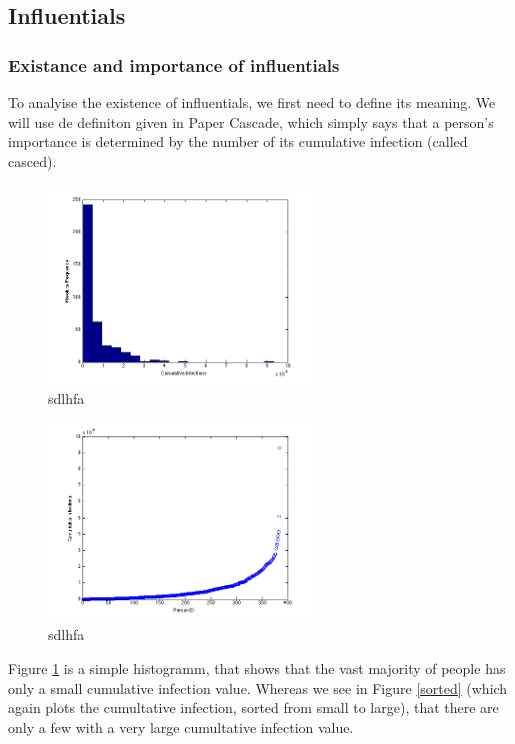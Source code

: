 \subsection{Influentials}

\subsubsection{Existance and importance of influentials}


To analyise the existence of influentials, we first need to define its meaning. We will use de definiton given in Paper Cascade\cite{Influentials}, which simply says that a person's importance is determined by the number of its cumulative infection (called casced).

\begin{figure}
\includegraphics[width=7cm]{influ2}
\caption{sdlhfa}
\label{Histo}
\end{figure}

\begin{figure}
\includegraphics[width=7cm]{influ1}
\caption{sdlhfa}
\label{Sorted}
\end{figure}

Figure \ref{Histo} is a simple histogramm, that shows that the vast majority of people has only a small cumulative infection value. Whereas we see in Figure \ref{sorted} (which again plots the cumultative infection, sorted from small to large), that there are only a few with a very large cumultative infection value. \\

